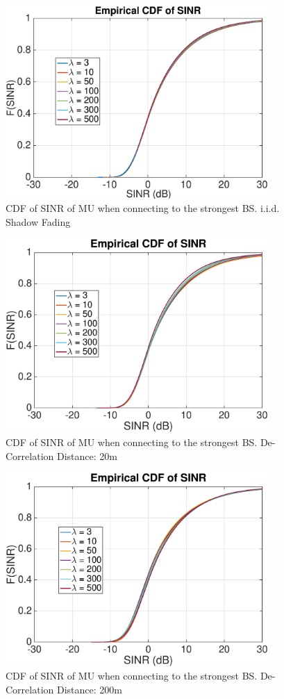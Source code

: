 \begin{figure}
\centering
\includegraphics[width=10cm]{MaxMax1000OutageProbCDFiid.eps}
\caption{CDF of SINR of MU when connecting to the strongest BS. i.i.d. Shadow Fading}
\label{Mode12}
\end{figure}
\begin{figure}
\centering
\includegraphics[width=10cm]{MaxMax1000OutageProbCDFDeCorr20.eps}
\caption{CDF of SINR of MU when connecting to the strongest BS. De-Correlation Distance: 20m}
\label{Mode22}
\end{figure}
\begin{figure}
\centering
\includegraphics[width=10cm]{MaxMax1000OutageProbCDFDeCorr200.eps}
\caption{CDF of SINR of MU when connecting to the strongest BS. De-Correlation Distance: 200m}
\label{Mode32}
\end{figure}

